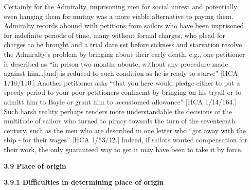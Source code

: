\begin{styleStandard}
Certainly for the Admiralty, imprisoning men for social unrest and potentially even hanging them for mutiny was a more viable alternative to paying them. Admiralty records abound with petitions from sailors who have been imprisoned for indefinite periods of time, many without formal charges, who plead for charges to be brought and a trial date set before sickness and starvation resolve the Admiralty’s problem by bringing about their early death, e.g., one petitioner is described as “in prison two months aboute, without any procedure made against him…[and] is reduced to such condition as he is ready to starve” [HCA 1/10/110.] Another petitioner asks “that you here would pledge either to put a speedy period to your poor petitioners confinemt by bringing on his tryall or to admitt him to Bayle or grant him to accustomed allowance” [HCA 1/14/164.] Such harsh reality perhaps renders more understandable the decisions of the multitude of sailors who turned to piracy towards the turn of the seventeenth century, such as the men who are described in one letter who “got away with the ship - for their wages” [HCA 1/53/12.] Indeed, if sailors wanted compensation for their work, the only guaranteed way to get it may have been to take it by force. 
\end{styleStandard}

\begin{styleStandard}
\textbf{3.9 Place of origin }
\end{styleStandard}

\begin{styleNormali}
\textbf{3.9.1 Difficulties in determining place of origin}
\end{styleNormali}

